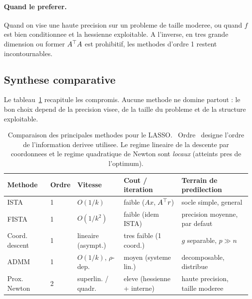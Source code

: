 \paragraph{Quand le preferer.} Quand on vise une haute precision sur un probleme
de taille moderee, ou quand $f$ est bien conditionnee et la hessienne
exploitable. A l'inverse, en tres grande dimension ou former $A^{\top} A$ est
prohibitif, les methodes d'ordre 1 restent incontournables.

\subsection{Synthese comparative}

Le tableau~\ref{tab:comparatif} recapitule les compromis. Aucune methode ne
domine partout : le bon choix depend de la precision visee, de la taille du
probleme et de la structure exploitable.

\begin{table}[h]
\centering
\small
\begin{tabular}{@{}lllll@{}}
\toprule
\textbf{Methode} & \textbf{Ordre} & \textbf{Vitesse} &
\textbf{Cout / iteration} & \textbf{Terrain de predilection} \\
\midrule
ISTA            & 1 & $O(1/k)$            & faible ($Ax$, $A^{\top} r$)        & socle simple, general \\
FISTA           & 1 & $O(1/k^2)$          & faible (idem ISTA)            & precision moyenne, par defaut \\
Coord. descent  & 1 & lineaire (asympt.)  & tres faible (1 coord.)        & $g$ separable, $p \gg n$ \\
ADMM            & 1 & $O(1/k)$, $\rho$-dep.& moyen (systeme lin.)         & decomposable, distribue \\
Prox. Newton    & 2 & superlin. / quadr.  & eleve (hessienne + interne)   & haute precision, taille moderee \\
\bottomrule
\end{tabular}
\caption{Comparaison des principales methodes pour le LASSO. \guillemotleft{}~Ordre~\guillemotright{}
designe l'ordre de l'information derivee utilisee. Le regime lineaire de la
descente par coordonnees et le regime quadratique de Newton sont \emph{locaux}
(atteints pres de l'optimum).}
\label{tab:comparatif}
\end{table}

